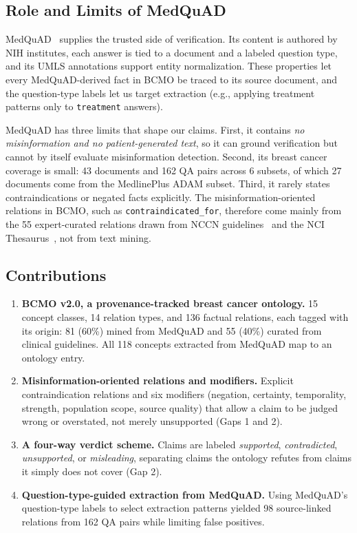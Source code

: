 \documentclass[10pt,a4paper]{article}
\begin{document}
\subsection{Role and Limits of MedQuAD}

MedQuAD~\cite{benabacha2019} supplies the trusted side of verification. Its content is authored by NIH institutes, each answer is tied to a document and a labeled question type, and its UMLS annotations support entity normalization. These properties let every MedQuAD-derived fact in BCMO be traced to its source document, and the question-type labels let us target extraction (e.g., applying treatment patterns only to \texttt{treatment} answers).

MedQuAD has three limits that shape our claims. First, it contains \emph{no misinformation and no patient-generated text}, so it can ground verification but cannot by itself evaluate misinformation detection. Second, its breast cancer coverage is small: 43 documents and 162 QA pairs across 6 subsets, of which 27 documents come from the MedlinePlus ADAM subset. Third, it rarely states contraindications or negated facts explicitly. The misinformation-oriented relations in BCMO, such as \texttt{contraindicated\_for}, therefore come mainly from the 55 expert-curated relations drawn from NCCN guidelines~\cite{nccn2026} and the NCI Thesaurus~\cite{nci2026}, not from text mining.

\subsection{Contributions}

\begin{enumerate}
    \item \textbf{BCMO v2.0, a provenance-tracked breast cancer ontology.} 15 concept classes, 14 relation types, and 136 factual relations, each tagged with its origin: 81 (60\%) mined from MedQuAD and 55 (40\%) curated from clinical guidelines. All 118 concepts extracted from MedQuAD map to an ontology entry.
    \item \textbf{Misinformation-oriented relations and modifiers.} Explicit contraindication relations and six modifiers (negation, certainty, temporality, strength, population scope, source quality) that allow a claim to be judged wrong or overstated, not merely unsupported (Gaps 1 and 2).
    \item \textbf{A four-way verdict scheme.} Claims are labeled \emph{supported}, \emph{contradicted}, \emph{unsupported}, or \emph{misleading}, separating claims the ontology refutes from claims it simply does not cover (Gap 2).
    \item \textbf{Question-type-guided extraction from MedQuAD.} Using MedQuAD's question-type labels to select extraction patterns yielded 98 source-linked relations from 162 QA pairs while limiting false positives.
\end{enumerate}
\end{document}
